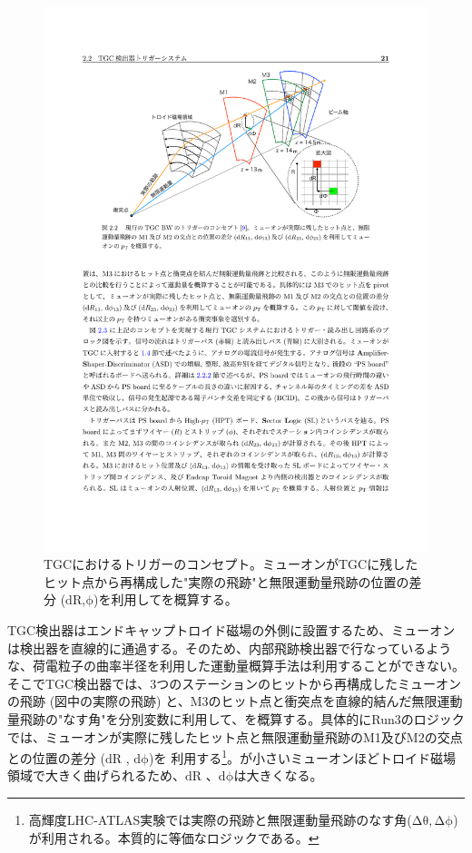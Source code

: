 \begin{figure} 
\centering
\includegraphics[width=16cm]{fig/Intro/TGC_triggerconcept.pdf}
\caption[TGCにおけるトリガーのコンセプト]{TGCにおけるトリガーのコンセプト\cite{mt_akatsuka}。ミューオンがTGCに残したヒット点から再構成した"実際の飛跡"と無限運動量飛跡の位置の差分 ($\mathrm{dR}$,$\mathrm{\phi}$)を利用して\pt を概算する。}
\label{TGC_triggerconcept}
\end{figure}

TGC検出器はエンドキャップトロイド磁場の外側に設置するため、ミューオンは検出器を直線的に通過する。そのため、内部飛跡検出器で行なっているような、荷電粒子の曲率半径を利用した運動量概算手法は利用することができない。そこでTGC検出器では、3つのステーションのヒットから再構成したミューオンの飛跡 (図中の実際の飛跡) と、M3のヒット点と衝突点を直線的結んだ無限運動量飛跡の"なす角"を分別変数に利用して、\pt を概算する。具体的にRun3のロジックでは、ミューオンが実際に残したヒット点と無限運動量飛跡のM1及びM2の交点との位置の差分  ($\mathrm{dR}$ , $\mathrm{d\phi}$)を 利用する\footnote{高輝度LHC-ATLAS実験では実際の飛跡と無限運動量飛跡のなす角($\mathrm{\Delta\theta, \Delta\phi}$)が利用される。本質的に等価なロジックである。}。\pt が小さいミューオンほどトロイド磁場領域で大きく曲げられるため、$\mathrm{dR}$ 、$\mathrm{d\phi}$は大きくなる。

